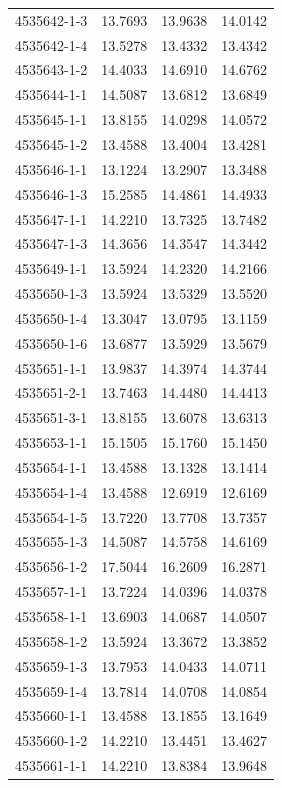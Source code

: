 \begin{longtable}{lrrr}
4535642-1-3 & 13.7693 & 13.9638 & 14.0142 \\
4535642-1-4 & 13.5278 & 13.4332 & 13.4342 \\
4535643-1-2 & 14.4033 & 14.6910 & 14.6762 \\
4535644-1-1 & 14.5087 & 13.6812 & 13.6849 \\
4535645-1-1 & 13.8155 & 14.0298 & 14.0572 \\
4535645-1-2 & 13.4588 & 13.4004 & 13.4281 \\
4535646-1-1 & 13.1224 & 13.2907 & 13.3488 \\
4535646-1-3 & 15.2585 & 14.4861 & 14.4933 \\
4535647-1-1 & 14.2210 & 13.7325 & 13.7482 \\
4535647-1-3 & 14.3656 & 14.3547 & 14.3442 \\
4535649-1-1 & 13.5924 & 14.2320 & 14.2166 \\
4535650-1-3 & 13.5924 & 13.5329 & 13.5520 \\
4535650-1-4 & 13.3047 & 13.0795 & 13.1159 \\
4535650-1-6 & 13.6877 & 13.5929 & 13.5679 \\
4535651-1-1 & 13.9837 & 14.3974 & 14.3744 \\
4535651-2-1 & 13.7463 & 14.4480 & 14.4413 \\
4535651-3-1 & 13.8155 & 13.6078 & 13.6313 \\
4535653-1-1 & 15.1505 & 15.1760 & 15.1450 \\
4535654-1-1 & 13.4588 & 13.1328 & 13.1414 \\
4535654-1-4 & 13.4588 & 12.6919 & 12.6169 \\
4535654-1-5 & 13.7220 & 13.7708 & 13.7357 \\
4535655-1-3 & 14.5087 & 14.5758 & 14.6169 \\
4535656-1-2 & 17.5044 & 16.2609 & 16.2871 \\
4535657-1-1 & 13.7224 & 14.0396 & 14.0378 \\
4535658-1-1 & 13.6903 & 14.0687 & 14.0507 \\
4535658-1-2 & 13.5924 & 13.3672 & 13.3852 \\
4535659-1-3 & 13.7953 & 14.0433 & 14.0711 \\
4535659-1-4 & 13.7814 & 14.0708 & 14.0854 \\
4535660-1-1 & 13.4588 & 13.1855 & 13.1649 \\
4535660-1-2 & 14.2210 & 13.4451 & 13.4627 \\
4535661-1-1 & 14.2210 & 13.8384 & 13.9648 \\

\end{longtable}
